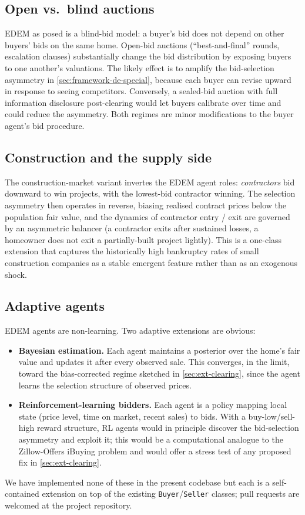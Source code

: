 \subsection{Open vs.\ blind auctions}
\label{sec:ext-auctions}

EDEM as posed is a blind-bid model: a buyer's bid does not depend on
other buyers' bids on the same home. Open-bid auctions
(``best-and-final'' rounds, escalation clauses) substantially change
the bid distribution by exposing buyers to one another's valuations.
The likely effect is to amplify the bid-selection asymmetry in
\cref{sec:framework-de-special}, because each buyer can revise upward
in response to seeing competitors. Conversely, a sealed-bid auction
with full information disclosure post-clearing would let buyers
calibrate over time and could reduce the asymmetry. Both regimes
are minor modifications to the buyer agent's bid procedure.

\subsection{Construction and the supply side}
\label{sec:ext-construction}

The construction-market variant invertes the EDEM agent roles:
\emph{contractors} bid downward to win projects, with the
lowest-bid contractor winning. The selection asymmetry then operates
in reverse, biasing realised contract prices below the population
fair value, and the dynamics of contractor entry / exit are governed
by an asymmetric balancer (a contractor exits after sustained losses,
a homeowner does not exit a partially-built project lightly). This
is a one-class extension that captures the historically high
bankruptcy rates of small construction companies as a stable
emergent feature rather than as an exogenous shock.

\subsection{Adaptive agents}
\label{sec:ext-adaptive}

EDEM agents are non-learning. Two adaptive extensions are obvious:

\begin{itemize}[leftmargin=*,nosep]
\item \textbf{Bayesian estimation.} Each agent maintains a posterior
      over the home's fair value and updates it after every observed
      sale. This converges, in the limit, toward the bias-corrected
      regime sketched in \cref{sec:ext-clearing}, since the agent
      learns the selection structure of observed prices.
\item \textbf{Reinforcement-learning bidders.} Each agent is a
      policy mapping local state (price level, time on market,
      recent sales) to bids. With a buy-low/sell-high reward
      structure, RL agents would in principle discover the
      bid-selection asymmetry and exploit it; this would be a
      computational analogue to the Zillow-Offers iBuying problem
      \citep{zillow2021ibuying} and would offer a stress test of any
      proposed fix in \cref{sec:ext-clearing}.
\end{itemize}

We have implemented none of these in the present codebase but each
is a self-contained extension on top of the existing
\texttt{Buyer}/\texttt{Seller} classes; pull requests are welcomed at
the project repository.
